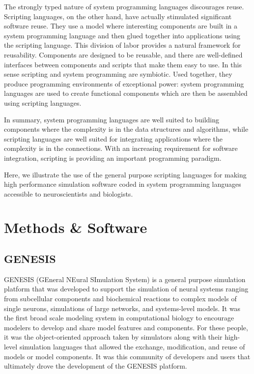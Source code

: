 \documentclass[12pt]{article}
\begin{document}
The strongly typed nature of system programming languages discourages
reuse. Scripting languages, on the other hand, have actually
stimulated significant software reuse. They use a model where
interesting components are built in a system programming language and
then glued together into applications using the scripting language.
This division of labor provides a natural framework for reusability.
Components are designed to be reusable, and there are well-defined
interfaces between components and scripts that make them easy to use.
In this sense scripting and system programming are symbiotic. Used
together, they produce programming environments of exceptional power:
system programming languages are used to create functional components
which are then be assembled using scripting languages.

In summary, system programming languages are well suited to building
components where the complexity is in the data structures and
algorithms, while scripting languages are well suited for integrating
applications where the complexity is in the connections. With an
increasing requirement for software integration, scripting is
providing an important programming paradigm.

Here, we illustrate the use of the general purpose scripting languages
for making high performance simulation software coded in system
programming languages accessible to neuroscientists and biologists.




\section{Methods \& Software}

\subsection{GENESIS}

GENESIS (GEneral NEural SImulation System) is a general purpose
simulation platform that was developed to support the simulation of
neural systems ranging from subcellular components and biochemical
reactions to complex models of single neurons, simulations of large
networks, and systems-level models. It was the first broad scale
modeling system in computational biology to encourage modelers to
develop and share model features and components. For these people, it
was the object-oriented approach taken by simulators along with their
high-level simulation languages that allowed the exchange,
modification, and reuse of models or model components. It was this
community of developers and users that ultimately drove the
development of the GENESIS platform.
\end{document}

